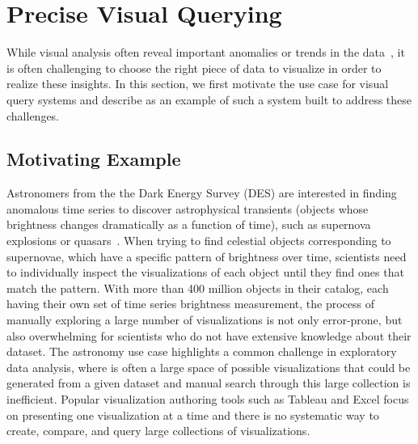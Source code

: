 
\section{Precise Visual Querying}\label{sec:precise}
While visual analysis often reveal important anomalies or trends in the data~\cite{Heer2012,Morton2014}, it is often challenging to choose the right piece of data to visualize in order to realize these insights. In this section, we first motivate the use case for visual query systems and describe \zv as an example of such a system built to address these challenges.
\subsection{Motivating Example}
Astronomers from the the Dark Energy Survey (DES) are interested in finding anomalous time series to discover astrophysical transients (objects whose brightness changes dramatically as a function of time), such as supernova explosions or quasars~\cite{Drlica-Wagner2017}. When trying to find celestial objects corresponding to supernovae, which have a specific pattern of brightness over time, scientists need to individually inspect the visualizations of each object until they find ones that match the pattern. With more than 400 million objects in their catalog, each having their own set of time series brightness measurement, the process of manually exploring a large number of visualizations is not only error-prone, but also overwhelming for scientists who do not have extensive knowledge about their dataset. The astronomy use case highlights a common challenge in exploratory data analysis, where is often a large space of possible visualizations that could be generated from a given dataset and manual search through this large collection is inefficient. Popular visualization authoring tools such as Tableau and Excel focus on presenting one visualization at a time and there is no systematic way to create, compare, and query large collections of visualizations. 

